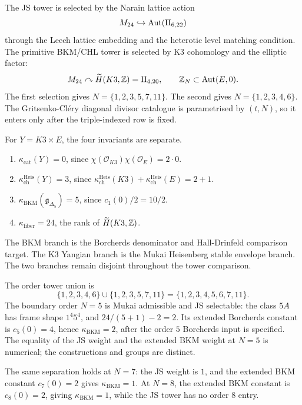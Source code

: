 \begin{remark}
\label{rem:two-m24-actions}
The JS tower is selected by the Narain lattice action
\[
  M_{24}\hookrightarrow \mathrm{Aut}(\mathrm{II}_{6,22})
\]
through the Leech lattice embedding and the heterotic level matching
condition. The primitive BKM/CHL tower is selected by K3 cohomology and the
elliptic factor:
\[
  M_{24}\curvearrowright \widetilde H(K3,\mathbb{Z})=\mathrm{II}_{4,20},
  \qquad
  \mathbb{Z}_N\subset \mathrm{Aut}(E,0).
\]
The first selection gives \(N=\{1,2,3,5,7,11\}\). The second gives
\(N=\{1,2,3,4,6\}\). The Gritsenko-Cl\'ery diagonal divisor catalogue
is parametrised by \((t,N)\), so it enters only after the
triple-indexed row is fixed.
\end{remark}

\begin{remark}
\label{rem:k3e-invariant-split-two-tower-note}
For \(Y=K3\times E\), the four invariants are separate.
\begin{enumerate}[label=\textup{(\alph*)}]
\item \(\kappa_{\mathrm{cat}}(Y)=0\), since
\(\chi(\mathcal O_{K3})\chi(\mathcal O_E)=2\cdot 0\).
\item \(\kappa_{\mathrm{ch}}^{\mathrm{Heis}}(Y)=3\), since
\(\kappa_{\mathrm{ch}}^{\mathrm{Heis}}(K3)+
\kappa_{\mathrm{ch}}^{\mathrm{Heis}}(E)=2+1\).
\item \(\kappa_{\mathrm{BKM}}(\mathfrak g_{\Delta_5})=5\), since
\(c_1(0)/2=10/2\).
\item \(\kappa_{\mathrm{fiber}}=24\), the rank of
\(\widetilde H(K3,\mathbb{Z})\).
\end{enumerate}
The BKM branch is the Borcherds denominator and Hall-Drinfeld
comparison target. The K3 Yangian branch is the Mukai Heisenberg
stable envelope branch. The two branches remain disjoint throughout
the tower comparison.
\end{remark}

\begin{remark}
\label{rem:union-and-n-equal-5}
The order tower union is
\[
  \{1,2,3,4,6\}\cup\{1,2,3,5,7,11\}
  =\{1,2,3,4,5,6,7,11\}.
\]
The boundary order \(N=5\) is Mukai admissible and JS selectable:
the class \(5A\) has frame shape \(1^4 5^4\), and
\(24/(5+1)-2=2\). Its extended Borcherds constant is
\(c_5(0)=4\), hence \(\kappa_{\mathrm{BKM}}=2\), after the order \(5\)
Borcherds input is specified. The equality of the JS weight and the
extended BKM weight at \(N=5\) is numerical; the constructions and
groups are distinct.

The same separation holds at \(N=7\): the JS weight is \(1\), and the
extended BKM constant \(c_7(0)=2\) gives \(\kappa_{\mathrm{BKM}}=1\).
At \(N=8\), the extended BKM constant is \(c_8(0)=2\), giving
\(\kappa_{\mathrm{BKM}}=1\), while the JS tower has no order \(8\)
entry.
\end{remark}

